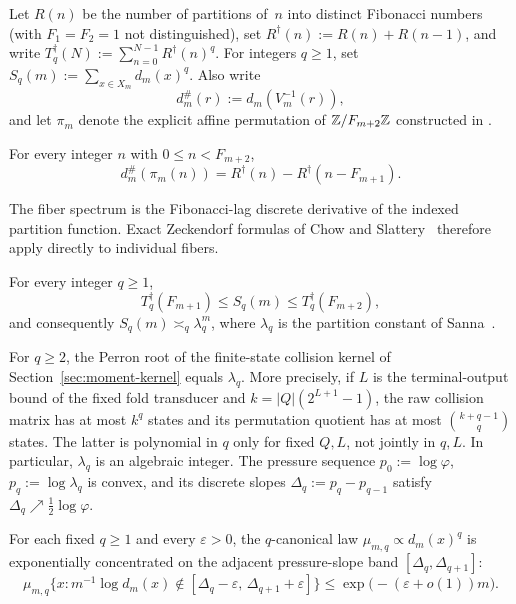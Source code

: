 Let $R(n)$ be the number of partitions of~$n$ into distinct Fibonacci numbers
(with $F_1=F_2=1$ not distinguished), set $R^\dagger(n):=R(n)+R(n-1)$, and
write $T_q^\dagger(N):=\sum_{n=0}^{N-1}R^\dagger(n)^q$.  For integers
$q\ge 1$, set $S_q(m):=\sum_{x\in X_m}d_m(x)^q$.  Also write
\[
  d_m^\#(r):=d_m(V_m^{-1}(r)),
\]
and let \(\pi_m\) denote the explicit affine permutation of
\(\mathbb{Z}/F_{m+2}\mathbb{Z}\) constructed in .

\begin{theoremA}
For every integer $n$ with $0\le n<F_{m+2}$,
\[
  d_m^\#(\pi_m(n))
  =
  R^\dagger(n)-R^\dagger(n-F_{m+1}).
\]
\end{theoremA}

\noindent
The fiber spectrum is the Fibonacci-lag discrete derivative of the indexed
partition function.  Exact Zeckendorf formulas of Chow and
Slattery~\cite{ChowSlattery2021} therefore apply directly to individual fibers.

\begin{theoremB}
For every integer $q\ge 1$,
\[
  T_q^\dagger(F_{m+1})\le S_q(m)\le T_q^\dagger(F_{m+2}),
\]
and consequently $S_q(m)\asymp_q \lambda_q^m$, where $\lambda_q$ is the
partition constant of Sanna~\cite[Thm.~1.1]{Sanna2025}.
\end{theoremB}

\begin{theoremC}
For $q\ge 2$, the Perron root of the finite-state collision kernel of
Section~\ref{sec:moment-kernel} equals $\lambda_q$.  More precisely,
if $L$ is the terminal-output bound of the fixed fold transducer and
$k=|Q|(2^{L+1}-1)$, the raw collision matrix has at most $k^q$ states and its
permutation quotient has at most $\binom{k+q-1}{q}$ states.  The latter is
polynomial in $q$ only for fixed $Q,L$, not jointly in $q,L$.  In particular,
$\lambda_q$ is an algebraic integer.  The pressure sequence $p_0:=\log\varphi$,
$p_q:=\log\lambda_q$ is convex, and its discrete slopes
$\Delta_q:=p_q-p_{q-1}$ satisfy $\Delta_q\nearrow\frac12\log\varphi$.
\end{theoremC}

\begin{theoremD}
For each fixed $q\ge 1$ and every $\varepsilon>0$, the $q$-canonical law
$\mu_{m,q}\propto d_m(x)^q$ is exponentially concentrated on the adjacent
pressure-slope band $[\Delta_q,\Delta_{q+1}]$:
\[
  \mu_{m,q}\bigl\{x:m^{-1}\log d_m(x)\notin
  [\Delta_q-\varepsilon,\,\Delta_{q+1}+\varepsilon]\bigr\}
  \le \exp\bigl(-(\varepsilon+o(1))m\bigr).
\]
\end{theoremD}

